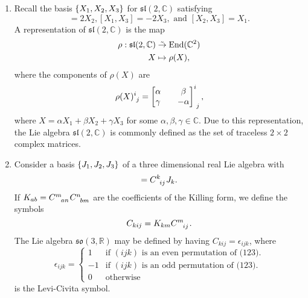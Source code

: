 \begin{example}
    \begin{enumerate}[label=(\alph*)]
        \item Recall the basis \(\{X_1, X_2, X_3\}\) for \(\mathfrak{sl}(2, \mathbb{C})\) satisfying
            \begin{equation*}
                [X_1, X_2] = 2X_2, [X_1, X_3] = -2X_3,\text{ and }[X_2, X_3] = X_1.
            \end{equation*}
            A representation of \(\mathfrak{sl}(2,\mathbb{C})\) is the map
            \begin{align*}
                \rho : \mathfrak{sl}(2,\mathbb{C}) &\mathrel{\tilde{\to}} \operatorname{End}(\mathbb{C}^2)\\
                                                 X &\mapsto \rho(X),
            \end{align*}
            where the components of \(\rho(X)\) are
            \begin{equation*}
                \rho(X)\indices{^i_j} = \begin{bmatrix}
                    \alpha && \beta\\
                    \gamma && -\alpha
                \end{bmatrix}\indices{^i_j},
            \end{equation*}
            where \(X = \alpha X_1 + \beta X_2 + \gamma X_3\) for some \(\alpha,\beta,\gamma \in \mathbb{C}\). Due to this representation, the Lie algebra \(\mathfrak{sl}(2,\mathbb{C})\) is commonly defined as the set of traceless \(2\times2\) complex matrices.
        \item Consider a basis \(\{J_1,J_2,J_3\}\) of a three dimensional real Lie algebra with
            \begin{equation*}
                [J_i, J_j] = C\indices{^k_{ij}}J_k.
            \end{equation*}
            If \(K_{ab} = C\indices{^m_{an}}C\indices{^n_{bm}}\) are the coefficients of the Killing form, we define the symbols
            \begin{equation*}
                C_{kij} = K_{km}C\indices{^m_{ij}}.
            \end{equation*}
            The Lie algebra \(\mathfrak{so}(3, \mathbb{R})\) may be defined by having \(C_{kij} = \epsilon_{ijk}\), where
            \begin{equation*}
                \epsilon_{ijk} = \begin{cases}
                    1 & \text{if } (ijk)\text{ is an even permutation of (123).}\\
                    -1 & \text{if } (ijk)\text{ is an odd permutation of (123).}\\
                    0 & \text{otherwise}
                \end{cases}
            \end{equation*}
            is the Levi-Civita symbol.


\end{enumerate}
\end{example}
